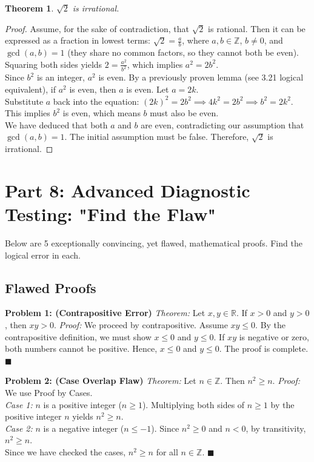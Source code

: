 \documentclass[11pt]{article}
\newtheorem{theorem}{Theorem}[section]
\begin{document}
\begin{theorem}
$\sqrt{2}$ is irrational.
\end{theorem}
\begin{proof}
Assume, for the sake of contradiction, that $\sqrt{2}$ is rational. Then it can be expressed as a fraction in lowest terms: $\sqrt{2} = \frac{a}{b}$, where $a, b \in \mathbb{Z}$, $b \neq 0$, and $\gcd(a,b) = 1$ (they share no common factors, so they cannot both be even). \\
Squaring both sides yields $2 = \frac{a^2}{b^2}$, which implies $a^2 = 2b^2$. \\
Since $b^2$ is an integer, $a^2$ is even. By a previously proven lemma (see 3.21 logical equivalent), if $a^2$ is even, then $a$ is even. Let $a = 2k$. \\
Substitute $a$ back into the equation: $(2k)^2 = 2b^2 \implies 4k^2 = 2b^2 \implies b^2 = 2k^2$. \\
This implies $b^2$ is even, which means $b$ must also be even. \\
We have deduced that both $a$ and $b$ are even, contradicting our assumption that $\gcd(a,b) = 1$. The initial assumption must be false. Therefore, $\sqrt{2}$ is irrational.
\end{proof}

\section{Part 8: Advanced Diagnostic Testing: "Find the Flaw"}

Below are 5 exceptionally convincing, yet flawed, mathematical proofs. Find the logical error in each.

\subsection{Flawed Proofs}

\textbf{Problem 1: (Contrapositive Error)}
\textit{Theorem:} Let $x, y \in \mathbb{R}$. If $x > 0$ and $y > 0$, then $xy > 0$.
\textit{Proof:} We proceed by contrapositive. Assume $xy \le 0$. By the contrapositive definition, we must show $x \le 0$ and $y \le 0$. If $xy$ is negative or zero, both numbers cannot be positive. Hence, $x \le 0$ and $y \le 0$. The proof is complete. $\blacksquare$

\textbf{Problem 2: (Case Overlap Flaw)}
\textit{Theorem:} Let $n \in \mathbb{Z}$. Then $n^2 \ge n$.
\textit{Proof:} We use Proof by Cases. \\
\textit{Case 1:} $n$ is a positive integer ($n \ge 1$). Multiplying both sides of $n \ge 1$ by the positive integer $n$ yields $n^2 \ge n$. \\
\textit{Case 2:} $n$ is a negative integer ($n \le -1$). Since $n^2 \ge 0$ and $n < 0$, by transitivity, $n^2 \ge n$. \\
Since we have checked the cases, $n^2 \ge n$ for all $n \in \mathbb{Z}$. $\blacksquare$
\end{document}

